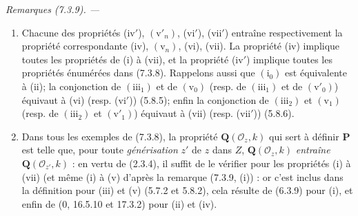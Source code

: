 \documentclass[10pt,oneside]{book}
\newcommand{\oldpage}[2][]{%
  \setcounter{footnote}{0}%
  \marginpar{\scriptsize\textbf{#1}~|~#2}\ignorespaces}
\newenvironment{remarks}[1][]{%
  \par\medskip\noindent\itshape Remarques (#1). ---\ }{\par}
\begin{document}
\begin{remarks}[7.3.9]
\label{IV.2.s7.3.9-fr}
\begin{enumerate}
\item[\emph{i)}] Chacune des propriétés (iv$'$), $(\mathrm v'_n)$, (vi$'$),
(vii$'$) entraîne respectivement la propriété correspondante (iv),
$(\mathrm v_n)$, (vi), (vii). La propriété (iv) implique toutes les
propriétés de (i) à (vii), et la propriété (iv$'$) implique toutes les
propriétés énumérées dans (7.3.8). Rappelons aussi que $(\mathrm i_0)$ est
équivalente à (ii); la conjonction de $(\mathrm{iii}_1)$ et de
$(\mathrm v_0)$ (resp. de $(\mathrm{iii}_1)$ et de
$(\mathrm v'_0)$) équivaut à (vi) (resp. (vi$'$)) (5.8.5); enfin la
conjonction de $(\mathrm{iii}_2)$ et $(\mathrm v_1)$ (resp. de
$(\mathrm{iii}_2)$ et $(\mathrm v'_1)$) équivaut à (vii) (resp.
(vii$'$)) (5.8.6).
\item[\emph{ii)}] Dans tous les exemples de (7.3.8), la propriété
$\boldsymbol Q(\mathscr O_z,k)$ qui sert à définir $\boldsymbol P$ est
telle que, pour toute \emph{générisation} $z'$ de $z$ dans $Z$,
$\boldsymbol Q(\mathscr O_z,k)$ \emph{entraîne}
$\boldsymbol Q(\mathscr O_{z'},k)$ : en vertu de (2.3.4), il suffit de le
vérifier pour les propriétés (i) à (vii) (et même (i) à (v) d'après la
remarque (7.3.9, (i)) : or c'est inclus dans la définition pour (iii) et
(v) (5.7.2 et 5.8.2), cela résulte de (6.3.9) pour (i), et enfin de
(0, 16.5.10 et 17.3.2) pour (ii) et (iv).
\end{enumerate}
\end{remarks}

\oldpage[IV-2]{195}
\end{document}
